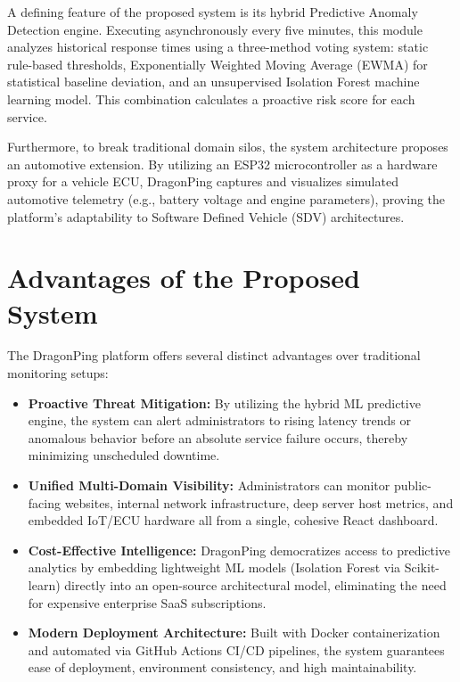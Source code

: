 \documentclass[12pt,a4paper,oneside]{report}
\begin{document}
\noindent A defining feature of the proposed system is its hybrid Predictive Anomaly Detection engine. Executing asynchronously every five minutes, this module analyzes historical response times using a three-method voting system: static rule-based thresholds, Exponentially Weighted Moving Average (EWMA) for statistical baseline deviation, and an unsupervised Isolation Forest machine learning model. This combination calculates a proactive risk score for each service.

\noindent Furthermore, to break traditional domain silos, the system architecture proposes an automotive extension. By utilizing an ESP32 microcontroller as a hardware proxy for a vehicle ECU, DragonPing captures and visualizes simulated automotive telemetry (e.g., battery voltage and engine parameters), proving the platform's adaptability to Software Defined Vehicle (SDV) architectures. 

\section{Advantages of the Proposed System}
\noindent The DragonPing platform offers several distinct advantages over traditional monitoring setups:
\begin{itemize}[label=\textbullet, leftmargin=*]
    \item \textbf{Proactive Threat Mitigation:} By utilizing the hybrid ML predictive engine, the system can alert administrators to rising latency trends or anomalous behavior before an absolute service failure occurs, thereby minimizing unscheduled downtime.
    \item \textbf{Unified Multi-Domain Visibility:} Administrators can monitor public-facing websites, internal network infrastructure, deep server host metrics, and embedded IoT/ECU hardware all from a single, cohesive React dashboard.
    \item \textbf{Cost-Effective Intelligence:} DragonPing democratizes access to predictive analytics by embedding lightweight ML models (Isolation Forest via Scikit-learn) directly into an open-source architectural model, eliminating the need for expensive enterprise SaaS subscriptions.
    \item \textbf{Modern Deployment Architecture:} Built with Docker containerization and automated via GitHub Actions CI/CD pipelines, the system guarantees ease of deployment, environment consistency, and high maintainability.
\end{itemize}
\end{document}
